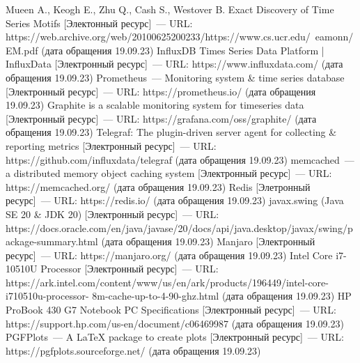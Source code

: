 \begin{thebibliography}{}
	 Mueen A., Keogh E., Zhu Q., Cash S., Westover B. Exact Discovery of Time Series Motifs [Электонный ресурс]~--- URL: https://web.archive.org/web/20100625200233/https://www.cs.ucr.edu/~eamonn/EM.pdf (дата обращения 19.09.23)
	 InfluxDB Times Series Data Platform | InfluxData [Электронный ресурс]~--- URL: https://www.influxdata.com/ (дата обращения 19.09.23)
	 Prometheus~--- Monitoring system \& time series database [Электронный ресурс]~--- URL: https://prometheus.io/ (дата обращения 19.09.23)
	 Graphite is a scalable monitoring system for timeseries data [Электронный ресурс]~--- URL: https://grafana.com/oss/graphite/ (дата обращения 19.09.23)
	 Telegraf: The plugin-driven server agent for collecting \& reporting metrics [Электронный ресурс]~--- URL: https://github.com/influxdata/telegraf (дата обращения 19.09.23)
	 memcached~--- a distributed memory object caching system [Электронный ресурс]~--- URL: https://memcached.org/ (дата обращения 19.09.23)
	 Redis [Элетронный ресурс]~--- URL: https://redis.io/ (дата обращения 19.09.23)
	 javax.swing (Java SE 20 \& JDK 20) [Электронный ресурс]~--- URL: https://docs.oracle.com/en/java/javase/20/docs/api/java.desktop/javax/swing/package-summary.html (дата обращения 19.09.23)
	 Manjaro [Электронный ресурс]~--- URL: https://manjaro.org/ (дата обращения 19.09.23)
	 Intel Core i7-10510U Processor [Электронный ресурс]~--- URL: https://ark.intel.com/content/www/us/en/ark/products/196449/intel-core-i710510u-processor-
	8m-cache-up-to-4-90-ghz.html (дата обращения 19.09.23)
	 HP ProBook 430 G7 Notebook PC Specifications [Электронный ресурс]~--- URL: https://support.hp.com/us-en/document/c06469987 (дата обращения 19.09.23)
	 PGFPlots~--- A LaTeX package to create plots [Электронный ресурс]~--- URL: https://pgfplots.sourceforge.net/ (дата обращения 19.09.23)
\end{thebibliography}
